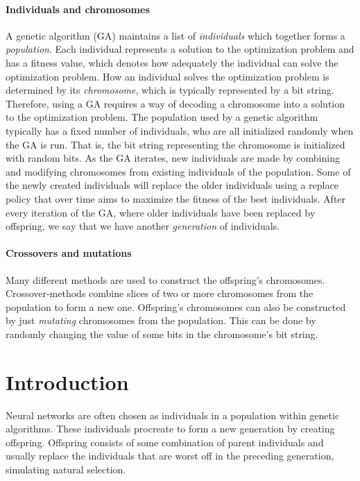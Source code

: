 \paragraph{Individuals and chromosomes}
A genetic algorithm (GA) maintains a list of \emph{individuals} which together forms a \emph{population}. 
Each individual represents a solution to the optimization problem and has a fitness value, which
denotes how adequately the individual can solve the optimization problem.
How an individual solves the optimization problem is determined by its \emph{chromosome}, which
is typically represented by a bit string. Therefore, using a GA requires a way of decoding
a chromosome into a solution to the optimization problem.
The population used by a genetic algorithm typically has a fixed number of individuals, who are
all initialized randomly when the GA is run. That is, the bit string representing the chromosome is
initialized with random bits.
As the GA iterates, new individuals are made by combining and modifying chromosomes from existing
individuals of the population.
Some of the newly created individuals will replace the older individuals using a replace policy
that over time aims to maximize the fitness of the best individuals.
After every iteration of the GA, where older individuals have been replaced by offspring, we
say that we have another \emph{generation} of individuals.

\paragraph{Crossovers and mutations}
Many different methods are used to construct the offspring's chromosomes.
Crossover-methods combine slices of two or more chromosomes from the population to form a new one.
Offspring's chromosomes can also be constructed by just \emph{mutating} chromosomes from the population.
This can be done by randomly changing the value of some bits in the chromosome's bit string.



\section{Introduction}
Neural networks are often chosen as individuals in a population within genetic algorithms. These individuals procreate to form a new generation by creating offspring. Offspring consists of some combination of parent individuals and usually replace the individuals that are worst off in the preceding generation, simulating natural selection.

